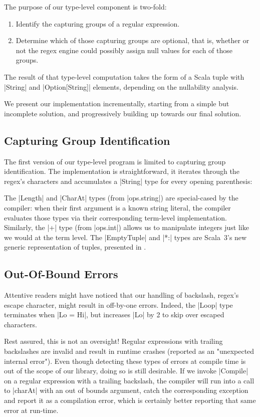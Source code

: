 The purpose of our type-level component is two-fold:

\begin{enumerate}
  \item Identify the capturing groups of a regular expression.
  \item Determine which of those capturing groups are optional, that is, whether or not the regex engine could possibly assign null values for each of those groups.
\end{enumerate}

\noindent
The result of that type-level computation takes the form of a Scala tuple with |String| and |Option[String]| elements, depending on the nullability analysis.

We present our implementation incrementally, starting from a simple but incomplete solution, and progressively building up towards our final solution.

\subsection{Capturing Group Identification}

The first version of our type-level program is limited to capturing group identification.
The implementation is straightforward, it iterates through the regex's characters and accumulates a |String| type for every opening parenthesis:

\regexFirstIteration

\noindent
The |Length| and |CharAt| types (from |ops.string|) are special-cased by the compiler: when their first argument is a known string literal, the compiler evaluates those types via their corresponding term-level implementation.
Similarly, the |+| type (from |ops.int|) allows us to manipulate integers just like we would at the term level.
The |EmptyTuple| and |*:| types are Scala~3's new generic representation of tuples, presented in .

\subsection{Out-Of-Bound Errors}

Attentive readers might have noticed that our handling of backslash, regex's escape character, might result in off-by-one errors.
Indeed, the |Loop| type terminates when |Lo = Hi|, but increases |Lo| by 2 to skip over escaped characters.

Rest assured, this is not an oversight!
Regular expressions with trailing backslashes are invalid and result in runtime crashes (reported as an "unexpected internal error").
Even though detecting these types of errors at compile time is out of the scope of our library, doing so is still desirable.
If we invoke |Compile| on a regular expression with a trailing backslash, the compiler will run into a call to |charAt| with an out of bounds argument, catch the corresponding exception and report it as a compilation error, which is certainly better reporting that same error at run-time.

